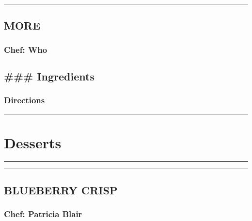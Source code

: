 \documentclass[
]{book}
\begin{document}
\begin{center}\rule{0.5\linewidth}{0.5pt}\end{center}

\hypertarget{more-3}{%
\section*{MORE}\label{more-3}}


\hypertarget{chef-who-3}{%
\subsection*{Chef: Who}\label{chef-who-3}}


\hypertarget{ingredients-81}{%
\section*{\#\#\# Ingredients}\label{ingredients-81}}


\hypertarget{directions-81}{%
\subsection*{Directions}\label{directions-81}}


\begin{center}\rule{0.5\linewidth}{0.5pt}\end{center}

\hypertarget{Deserts}{%
\chapter{Desserts}\label{Deserts}}

\begin{center}\rule{0.5\linewidth}{0.5pt}\end{center}

\begin{center}\rule{0.5\linewidth}{0.5pt}\end{center}

\hypertarget{blueberry-crisp}{%
\section*{BLUEBERRY CRISP}\label{blueberry-crisp}}


\hypertarget{chef-patricia-blair-13}{%
\subsection*{Chef: Patricia Blair}\label{chef-patricia-blair-13}}
\end{document}
